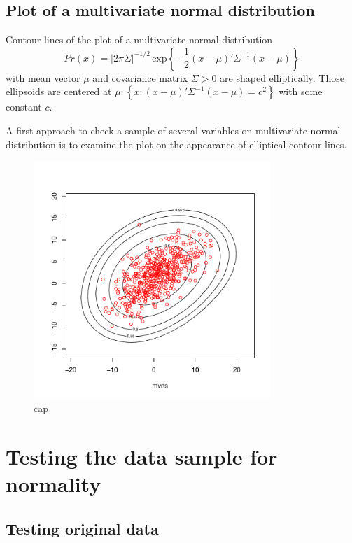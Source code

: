 \documentclass[a4paper, 12pt, titlepage, headsepline, listof = totoc, bibliography = totoc, numbers = noenddot]{scrartcl}
\begin{document}
\vfill

\newpage
\subsection{Plot of a multivariate normal distribution}

Contour lines of the plot of a multivariate normal distribution
\[Pr(x) = |2\pi\Sigma|^{-1/2} \,\mbox{exp}\left\{-\frac{1}{2}(x-\mu)' \Sigma^{-1}(x-\mu)\right\}\]
with mean vector $\mu$ and covariance matrix $\Sigma > 0$ are shaped elliptically. Those ellipsoids are centered at $\mu : \left\{x:(x-\mu)'\Sigma^{-1}(x-\mu) = c^2\right\}$ with some constant $c$.

A first approach to check a sample of several variables on multivariate normal distribution is to examine the plot on the appearance of elliptical contour lines.

\begin{figure}[h!]
\centering
\includegraphics[width=0.8\textwidth]{report-plotMVNSim}
\caption{cap}
\label{fig:plotMVNSim}
\end{figure}



\newpage
\section{Testing the data sample for normality}

\subsection{Testing original data}
\end{document}
